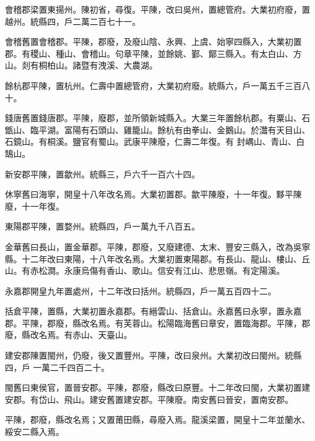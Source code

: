 \begin{pinyinscope}
 會稽郡梁置東揚州。陳初省，尋復。平陳，改曰吳州，置總管府。大業初府廢，置越州。統縣四，戶二萬二百七十一。



 會稽舊置會稽郡。平陳，郡廢，及廢山陰、永興、上虞、始寧四縣入，大業初置郡。有稷山、種山、會稽山。句章平陳，並餘姚、鄞、鄮三縣入。有太白山、方山。剡有桐柏山。諸暨有洩溪、大農湖。



 餘杭郡平陳，置杭州。仁壽中置總管府，大業初府廢。統縣六，戶一萬五千三百八十。



 錢唐舊置錢唐郡。平陳，廢郡，並所領新城縣入。大業三年置餘杭郡。有粟山、石甑山、臨平湖。富陽有石頭山、雞籠山。餘杭有由拳山、金鵝山。於灊有天目山、石鏡山。有桐溪。鹽官有蜀山。武康平陳廢，仁壽二年復。有
 封嵎山、青山、白鵠山。



 新安郡平陳，置歙州。統縣三，戶六千一百六十四。



 休寧舊曰海寧，開皇十八年改名焉。大業初置郡。歙平陳廢，十一年復。黟平陳廢，十一年復。



 東陽郡平陳，置婺州。統縣四，戶一萬九千八百五。



 金華舊曰長山，置金華郡。平陳，郡廢，又廢建德、太末、豐安三縣入，改為吳寧縣。十二年改曰東陽，十八年改名焉。大業初置東陽郡。有長山、龍山、樓山、丘山。有赤松澗。永康烏傷有香山、歌山。信安有江山、悲思嶺。有定陽溪。



 永嘉郡開皇九年置處州，十二年改曰括州。統縣四，戶一萬五百四十二。



 括倉平陳，置縣，大業初置永嘉郡。有縉雲山、括倉山。永嘉舊曰永寧，置永嘉郡。平陳，郡廢，縣改名焉。有芙蓉山。松陽臨海舊曰章安，置臨海郡。平陳，郡廢，縣改名焉。有赤山、天臺山。



 建安郡陳置閩州，仍廢，後又置豐州。平陳，改曰泉州。大業初改曰閩州。統縣四，戶
 一萬二千四百二十。



 閩舊曰東侯官，置晉安郡。平陳，郡廢，縣改曰原豐。十二年改曰閩，大業初置建安郡。有岱山、飛山。建安舊置建安郡。平陳廢。南安舊曰晉安，置南安郡。



 平陳，郡廢，縣改名焉；又置莆田縣，尋廢入焉。龍溪梁置，開皇十二年並蘭水、綏安二縣入焉。




\end{pinyinscope}

